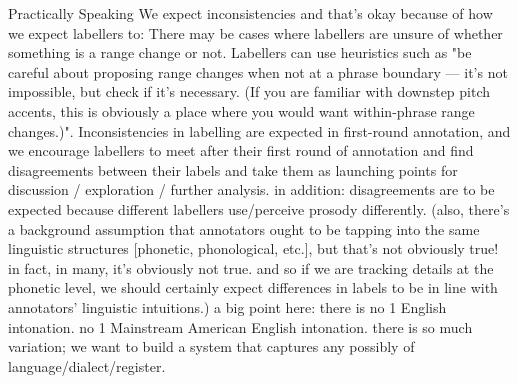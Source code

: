 \markdownRendererUlEndTight \markdownRendererUlItemEnd 
\markdownRendererUlItem Practically Speaking\markdownRendererInterblockSeparator
{}\markdownRendererUlBeginTight
\markdownRendererUlItem We expect inconsistencies and that’s okay because of how we expect labellers to:\markdownRendererInterblockSeparator
{}\markdownRendererUlBeginTight
\markdownRendererUlItem {}\markdownRendererSoftLineBreak
{}There may be cases where labellers are unsure of whether something is a range change or not.\markdownRendererSoftLineBreak
{}Labellers can use heuristics such as "be careful about proposing range changes when not at a phrase boundary — it's not impossible, but check if it's necessary. (If you are familiar with downstep pitch accents, this is obviously a place where you would want within-phrase range changes.)".\markdownRendererUlItemEnd 
\markdownRendererUlItem {}\markdownRendererInterblockSeparator
{}\markdownRendererUlBeginTight
\markdownRendererUlItem Inconsistencies in labelling are expected in first-round annotation, and we encourage labellers to meet after their first round of annotation and find disagreements between their labels and take them as launching points for discussion / exploration / further analysis.\markdownRendererInterblockSeparator
{}\markdownRendererUlBeginTight
{}\markdownRendererUlItemEnd 
\markdownRendererUlEndTight \markdownRendererUlItemEnd 
\markdownRendererUlItem in addition: disagreements are to be expected because different labellers use/perceive prosody differently. (also, there's a background assumption that annotators ought to be tapping into the same linguistic structures [phonetic, phonological, etc.], but that's not obviously true! in fact, in many, it's obviously not true. and so if we are tracking details at the phonetic level, we should certainly expect differences in labels to be in line with annotators' linguistic intuitions.)\markdownRendererInterblockSeparator
{}\markdownRendererUlBeginTight
\markdownRendererUlItem a big point here: there is no 1 English intonation. no 1 Mainstream American English intonation. there is so much variation; we want to build a system that captures any possibly of language/dialect/register.\markdownRendererUlItemEnd 
